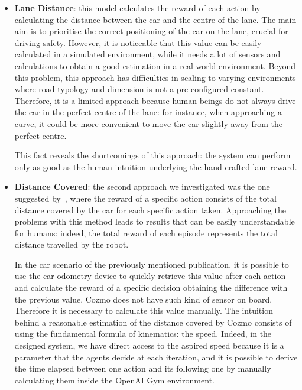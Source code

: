 \begin{itemize}
    \item \textbf{Lane Distance}: this model calculates the reward of each action by calculating the distance between the car and the centre of the lane.
          The main aim is to prioritise the correct positioning of the car on the lane, crucial for driving safety.
          However, it is noticeable that this value can be easily calculated in a simulated environment, while it needs a lot of sensors and calculations to obtain a good estimation in a real-world environment.
          Beyond this problem, this approach has difficulties in scaling to varying environments where road typology and dimension is not a pre-configured constant.
          Therefore, it is a limited approach because human beings do not always drive the car in the perfect centre of the lane: for instance, when approaching a curve, it could be more convenient to move the car slightly away from the perfect centre.

          This fact reveals the shortcomings of this approach: the system can perform only as good as the human intuition underlying the hand-crafted lane reward.

    \item \textbf{Distance Covered}: the second approach we investigated was the one suggested by~\cite{kendall2018learning,kendall2019learning}, where the reward of a specific action consists of the total distance covered by the car for each specific action taken.
          Approaching the problems with this method leads to results that can be easily understandable for humans: indeed, the total reward of each episode represents the total distance travelled by the robot.

          In the car scenario of the previously mentioned publication, it is possible to use the car odometry device to quickly retrieve this value after each action and calculate the reward of a specific decision obtaining the difference with the previous value.
          Cozmo does not have such kind of sensor on board.
          Therefore it is necessary to calculate this value manually.
          The intuition behind a reasonable estimation of the distance covered by Cozmo consists of using the fundamental formula of kinematics: the speed.
          Indeed, in the designed system, we have direct access to the aspired speed because it is a parameter that the agents decide at each iteration, and it is possible to derive the time elapsed between one action and its following one by manually calculating them inside the OpenAI Gym environment.


\end{itemize}
